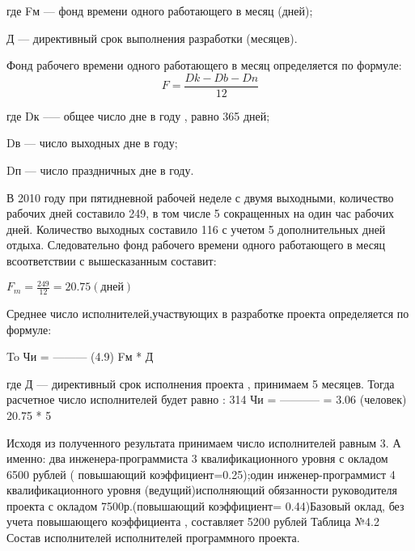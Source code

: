 \begin{ESKDexplanation}
    \item[где ]{} Fм --- фонд времени одного работающего в месяц (дней);
    \item{} Д --- директивный срок выполнения разработки (месяцев).
\begin{ESKDexplanation}

Фонд рабочего времени одного работающего в месяц определяется по формуле:
\begin{equation}
    F = \frac{Dk - Db - Dn}{12}
\end{equation}

\begin{ESKDexplanation}
    \item[где ]{} Dк --— общее число дне в году , равно 365 дней;
    \item{} Dв --- число выходных дне в году;
    \item{} Dп --- число праздничных дне в году.
\begin{ESKDexplanation}

В 2010 году при пятидневной рабочей неделе с двумя выходными, количество рабочих дней составило 249,
в том числе 5 сокращенных на один час рабочих дней. Количество выходных составило 116 с учетом 5
дополнительных дней отдыха. Следовательно фонд рабочего времени одного работающего в месяц всоответствии
с вышесказанным составит:

$F_m = \frac{249}{12} = 20.75 (дней)$


Среднее число исполнителей,участвующих в разработке проекта определяется
   по формуле:

                                                              To
                                           Чи =        ---------                                                          (4.9)          
                                                            Fм   *  Д

где Д — директивный срок исполнения проекта , принимаем 5 месяцев.
Тогда расчетное число исполнителей будет равно :
                                          314
                          Чи =   -----------  = 3.06 (человек)
                                    20.75 * 5

Исходя из полученного результата принимаем число исполнителей равным 3.
А именно:  два инженера-программиста 3 квалификационного уровня с окладом
6500 рублей ( повышающий коэффициент=0.25);один инженер-программист 4 квалификационного уровня (ведущий)исполняющий обязанности руководителя проекта с окладом 7500р.(повышающий коэффициент= 0.44)Базовый оклад, без учета повышающего коэффициента , составляет  5200 рублей 
                                                                                                                 Таблица №4.2           Состав исполнителей исполнителей программного проекта.   


\end{ESKDexplanation}
\end{ESKDexplanation}
\end{ESKDexplanation}
\end{ESKDexplanation}
